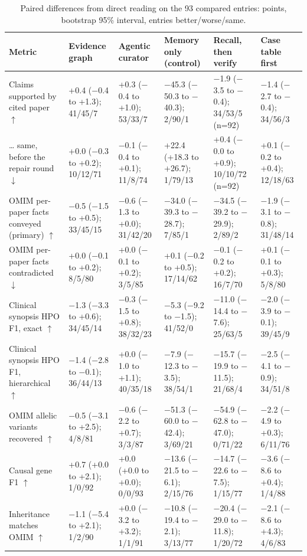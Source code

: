 \documentclass{article} %
\begin{document}
\begin{table}[!htbp]
\caption{Paired differences from direct reading on the 93 compared entries: points, bootstrap 95\% interval, entries better/worse/same.}
\label{tab:app_paired}
\scriptsize
\begin{tabularx}{\linewidth}{>{\raggedright\arraybackslash}p{3.0cm}>{\centering\arraybackslash}X>{\centering\arraybackslash}X>{\centering\arraybackslash}X>{\centering\arraybackslash}X>{\centering\arraybackslash}X}
\toprule
Metric & Evidence graph & Agentic curator & Memory only (control) & Recall, then verify & Case table first \\
\midrule
Claims supported by cited paper $\uparrow$ & +0.4 ($-$0.4 to +1.3); 41/45/7 & +0.3 ($-$0.4 to +1.0); 53/33/7 & $-$45.3 ($-$50.3 to $-$40.3); 2/90/1 & $-$1.9 ($-$3.5 to $-$0.4); 34/53/5 (n=92) & $-$1.4 ($-$2.7 to $-$0.4); 34/56/3 \\
\ldots{} same, before the repair round $\downarrow$ & +0.0 ($-$0.3 to +0.2); 10/12/71 & $-$0.1 ($-$0.4 to +0.1); 11/8/74 & +22.4 (+18.3 to +26.7); 1/79/13 & +0.4 ($-$0.0 to +0.9); 10/10/72 (n=92) & +0.1 ($-$0.2 to +0.4); 12/18/63 \\
OMIM per-paper facts conveyed (primary) $\uparrow$ & $-$0.5 ($-$1.5 to +0.5); 33/45/15 & $-$0.6 ($-$1.3 to +0.0); 31/42/20 & $-$34.0 ($-$39.3 to $-$28.7); 7/85/1 & $-$34.5 ($-$39.2 to $-$29.9); 2/89/2 & $-$1.9 ($-$3.1 to $-$0.8); 31/48/14 \\
OMIM per-paper facts contradicted $\downarrow$ & +0.0 ($-$0.1 to +0.2); 8/5/80 & +0.0 ($-$0.1 to +0.2); 3/5/85 & +0.1 ($-$0.2 to +0.5); 17/14/62 & $-$0.1 ($-$0.2 to +0.2); 16/7/70 & +0.1 ($-$0.1 to +0.3); 5/8/80 \\
Clinical synopsis HPO F1, exact $\uparrow$ & $-$1.3 ($-$3.3 to +0.6); 34/45/14 & $-$0.3 ($-$1.5 to +0.8); 38/32/23 & $-$5.3 ($-$9.2 to $-$1.5); 41/52/0 & $-$11.0 ($-$14.4 to $-$7.6); 25/63/5 & $-$2.0 ($-$3.9 to $-$0.1); 39/45/9 \\
Clinical synopsis HPO F1, hierarchical $\uparrow$ & $-$1.4 ($-$2.8 to $-$0.1); 36/44/13 & +0.0 ($-$1.0 to +1.1); 40/35/18 & $-$7.9 ($-$12.3 to $-$3.5); 38/54/1 & $-$15.7 ($-$19.9 to $-$11.5); 21/68/4 & $-$2.5 ($-$4.1 to $-$0.9); 34/51/8 \\
OMIM allelic variants recovered $\uparrow$ & $-$0.5 ($-$3.1 to +2.5); 4/8/81 & $-$0.6 ($-$2.2 to +0.7); 3/3/87 & $-$51.3 ($-$60.0 to $-$42.4); 3/69/21 & $-$54.9 ($-$62.8 to $-$47.0); 0/71/22 & $-$2.2 ($-$4.9 to +0.3); 6/11/76 \\
Causal gene F1 $\uparrow$ & +0.7 (+0.0 to +2.1); 1/0/92 & +0.0 (+0.0 to +0.0); 0/0/93 & $-$13.6 ($-$21.5 to $-$6.1); 2/15/76 & $-$14.7 ($-$22.6 to $-$7.5); 1/15/77 & $-$3.6 ($-$8.6 to +0.4); 1/4/88 \\
Inheritance matches OMIM $\uparrow$ & $-$1.1 ($-$5.4 to +2.1); 1/2/90 & +0.0 ($-$3.2 to +3.2); 1/1/91 & $-$10.8 ($-$19.4 to $-$2.1); 3/13/77 & $-$20.4 ($-$29.0 to $-$11.8); 1/20/72 & $-$2.1 ($-$8.6 to +4.3); 4/6/83 \\
\bottomrule
\end{tabularx}
\end{table}
\end{document}
